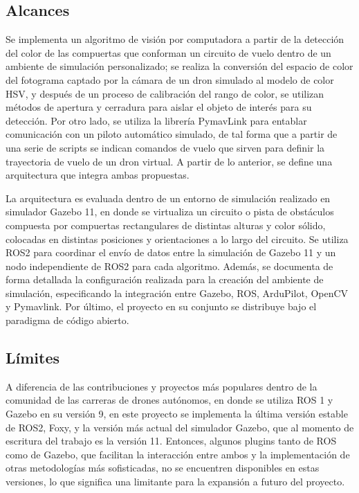 \subsection{Alcances}
Se implementa un algoritmo de visión por computadora a partir de la detección del color de las compuertas que conforman un circuito de vuelo dentro de un ambiente de simulación personalizado; se realiza la conversión del espacio de color del fotograma captado por la cámara de un dron simulado al modelo de color HSV, y después de un proceso de calibración del rango de color, se utilizan métodos de apertura y cerradura para aislar el objeto de interés para su detección. Por otro lado, se utiliza la librería PymavLink para entablar comunicación con un piloto automático simulado, de tal forma que a partir de una serie de scripts se indican comandos de vuelo que sirven para definir la trayectoria de vuelo de un dron virtual. A partir de lo anterior, se define una arquitectura que integra ambas propuestas.  

La arquitectura es evaluada dentro de un entorno de simulación realizado en simulador Gazebo 11, en donde se virtualiza un circuito o pista de obstáculos compuesta por compuertas rectangulares de distintas alturas y color sólido, colocadas en distintas posiciones y orientaciones a lo largo del circuito. Se utiliza ROS2 para coordinar el envío de datos entre la simulación de Gazebo 11 y un nodo independiente de ROS2 para cada algoritmo. Además, se documenta de forma detallada la configuración realizada para la creación del ambiente de simulación, especificando la integración entre Gazebo, ROS, ArduPilot, OpenCV y Pymavlink. Por último, el proyecto en su conjunto se distribuye bajo el paradigma de código abierto.

\subsection{Límites}
A diferencia de las contribuciones y proyectos más populares dentro de la comunidad de las carreras de drones autónomos, en donde se utiliza ROS 1 y Gazebo en su versión 9, en este proyecto se implementa la última versión estable de ROS2, Foxy, y la versión más actual del simulador Gazebo, que al momento de escritura del trabajo es la versión 11. Entonces, algunos plugins tanto de ROS como de Gazebo, que facilitan la interacción entre ambos y la implementación de otras metodologías más sofisticadas, no se encuentren disponibles en estas versiones, lo que significa una limitante para la expansión a futuro del proyecto. 

